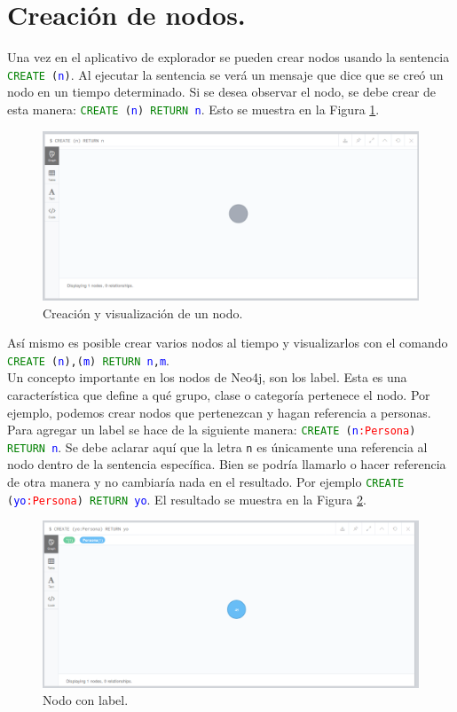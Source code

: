 \documentclass[conference]{IEEEtran}
\begin{document}
\section{Creación de nodos.}

Una vez en el aplicativo de explorador se pueden crear nodos usando la sentencia \texttt{\textcolor{green}{CREATE} (\textcolor{blue}{n})}. Al ejecutar la sentencia se verá un mensaje que dice que se creó un nodo en un tiempo determinado. Si se desea observar el nodo, se debe crear de esta manera: \texttt{\textcolor{green}{CREATE} (\textcolor{blue}{n}) \textcolor{green}{RETURN} \textcolor{blue}{n}}. Esto se muestra en la Figura  \ref{fig16}.

\begin{figure}[H]
\begin{center}
\includegraphics[width= 0.45 \textwidth]{create_node1.png}
\end{center}
\caption{Creación y visualización de un nodo.}
\label{fig16}
\end{figure}

Así mismo es posible crear varios nodos al tiempo y visualizarlos con el comando \texttt{\textcolor{green}{CREATE} (\textcolor{blue}{n}),(\textcolor{blue}{m}) \textcolor{green}{RETURN} \textcolor{blue}{n},\textcolor{blue}{m}}. 
\\
Un concepto importante en los nodos de Neo4j, son los label. Esta es una característica que define a qué grupo, clase o categoría pertenece el nodo. Por ejemplo, podemos crear nodos que pertenezcan y hagan referencia a personas. 
\\
Para agregar un label se hace de la siguiente manera: \texttt{\textcolor{green}{CREATE} (\textcolor{blue}{n}\textcolor{red}{:Persona}) \textcolor{green}{RETURN} \textcolor{blue}{n}}. Se debe aclarar aquí que la letra \texttt{n} es únicamente una referencia al nodo dentro de la sentencia específica. Bien se podría llamarlo o hacer referencia de otra manera y no cambiaría nada en el resultado. Por ejemplo \texttt{\textcolor{green}{CREATE} (\textcolor{blue}{yo}\textcolor{red}{:Persona}) \textcolor{green}{RETURN} \textcolor{blue}{yo}}. El resultado se muestra en la Figura \ref{fig17}.

\begin{figure}[H]
\begin{center}
\includegraphics[width= 0.45 \textwidth]{crear_nodo_label1.png}
\end{center}
\caption{Nodo con label.}
\label{fig17}
\end{figure}
\end{document}
